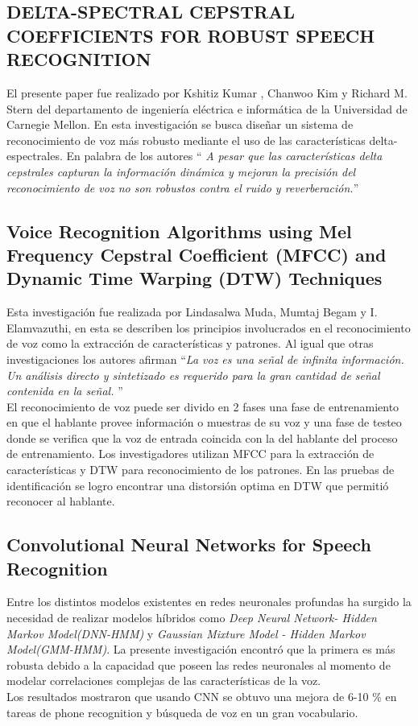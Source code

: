 \subsection{DELTA-SPECTRAL CEPSTRAL COEFFICIENTS FOR ROBUST SPEECH RECOGNITION}

El presente paper fue realizado por Kshitiz Kumar  , Chanwoo Kim y Richard M. Stern del departamento de ingeniería eléctrica e informática de la Universidad de Carnegie Mellon. En esta investigación se busca diseñar un sistema de reconocimiento de voz más robusto mediante el uso de las características delta-espectrales. En palabra de los autores \textquotedblleft \textit{ A pesar que las características delta cepstrales capturan la información dinámica y mejoran la precisión del reconocimiento de voz no son robustos contra el ruido y reverberación.}\textquotedblright

\subsection{Voice Recognition Algorithms using Mel Frequency Cepstral Coefficient (MFCC) and Dynamic Time Warping (DTW) Techniques
}
Esta investigación fue realizada por Lindasalwa Muda, Mumtaj Begam y I. Elamvazuthi, en esta se describen los principios involucrados en el reconocimiento de voz como la extracción de características y patrones. Al igual que otras investigaciones los autores afirman \textquotedblleft \textit{La voz es una señal de infinita información. Un análisis directo y sintetizado es requerido para la gran cantidad de señal contenida en la señal.} \textquotedblright \\ El reconocimiento de voz puede ser divido en 2 fases una fase de entrenamiento en que el hablante provee información o muestras de su voz y una fase de testeo donde se verifica que la voz de entrada coincida con la del hablante del proceso de entrenamiento.	Los investigadores utilizan MFCC para la extracción de características y DTW para reconocimiento de los patrones. En las pruebas de identificación se logro encontrar una distorsión optima en DTW que permitió reconocer al hablante.
\subsection{Convolutional Neural Networks for Speech Recognition}
Entre los distintos modelos existentes en redes neuronales profundas ha surgido la necesidad de realizar modelos híbridos como \textit{Deep Neural Network- Hidden Markov Model(DNN-HMM)} y \textit{Gaussian Mixture Model - Hidden Markov Model(GMM-HMM)}. La presente investigación encontró que la primera es más robusta debido a la capacidad que poseen las redes neuronales al momento de modelar correlaciones complejas de las características de la voz.\\ Los resultados mostraron que usando CNN se obtuvo una mejora de 6-10 \% en tareas de phone recognition y búsqueda de voz en un gran vocabulario.

